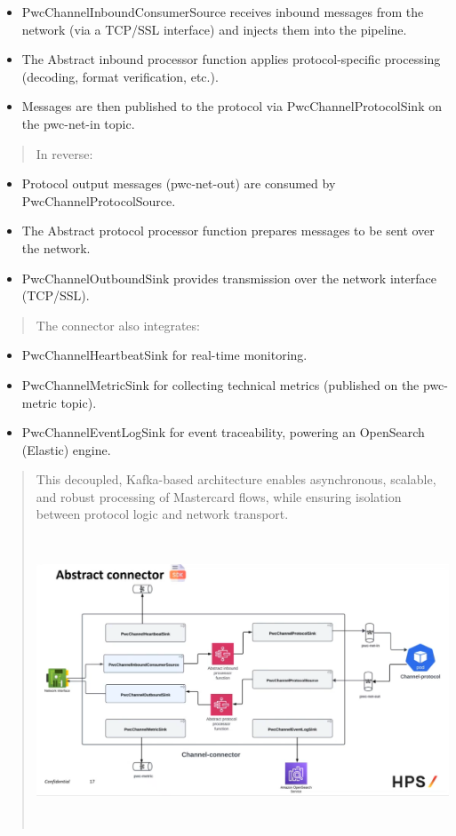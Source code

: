 \documentclass[12pt,a4paper]{report}
\begin{document}
\begin{itemize}
\item
  PwcChannelInboundConsumerSource receives inbound messages from the
  network (via a TCP/SSL interface) and injects them into the pipeline.
\item
  The Abstract inbound processor function applies protocol-specific
  processing (decoding, format verification, etc.).
\item
  Messages are then published to the protocol via PwcChannelProtocolSink
  on the pwc-net-in topic.
\end{itemize}

\begin{quote}
In reverse:
\end{quote}

\begin{itemize}
\item
  Protocol output messages (pwc-net-out) are consumed by
  PwcChannelProtocolSource.
\item
  The Abstract protocol processor function prepares messages to be sent
  over the network.
\item
  PwcChannelOutboundSink provides transmission over the network
  interface (TCP/SSL).
\end{itemize}

\begin{quote}
The connector also integrates:
\end{quote}

\begin{itemize}
\item
  PwcChannelHeartbeatSink for real-time monitoring.
\item
  PwcChannelMetricSink for collecting technical metrics (published on
  the pwc-metric topic).
\item
  PwcChannelEventLogSink for event traceability, powering an OpenSearch
  (Elastic) engine.
\end{itemize}

\begin{quote}
This decoupled, Kafka-based architecture enables asynchronous, scalable,
and robust processing of Mastercard flows, while ensuring isolation
between protocol logic and network transport.

\includegraphics[width=6.03815in,height=3.38958in]{vertopal_d1b0b2209edd4c6aa8254f57daa0953b/media/image51.png}
\end{quote}
\end{document}
